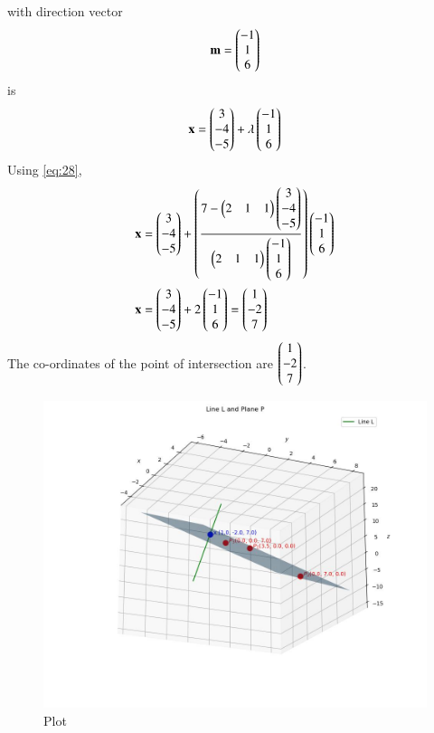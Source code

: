 \documentclass[journal]{IEEEtran}
\begin{document}
with direction vector 
\begin{align*}
    \mathbf{m} = \begin{pmatrix}-1 \\ 1 \\ 6\end{pmatrix}
\end{align*}
is
\begin{align}
    \mathbf{x} = \begin{pmatrix}3 \\ -4 \\ -5\end{pmatrix} + \lambda \begin{pmatrix}-1 \\ 1 \\ 6\end{pmatrix} \label{eq:line_eqn}
\end{align}
Using \eqref{eq:28},
\begin{align}
    \mathbf{x} &= \begin{pmatrix}3 \\ -4 \\ -5\end{pmatrix} + \left(\frac{7 - \begin{pmatrix}2 & 1 & 1\end{pmatrix}\begin{pmatrix}3 \\ -4 \\ -5\end{pmatrix}}{\begin{pmatrix}2 & 1 & 1\end{pmatrix}\begin{pmatrix}-1 \\ 1 \\ 6\end{pmatrix}}\right)\begin{pmatrix}-1 \\ 1 \\ 6\end{pmatrix} \\
    \mathbf{x} &= \begin{pmatrix}3 \\ -4 \\ -5\end{pmatrix} + 2\begin{pmatrix}-1 \\ 1 \\ 6\end{pmatrix} = \begin{pmatrix}1 \\ -2 \\ 7\end{pmatrix}
\end{align}
The co-ordinates of the point of intersection are $\begin{pmatrix}1 \\ -2 \\ 7\end{pmatrix}$.

\begin{figure}[h!]
	\centering
	\includegraphics[width=\columnwidth]{figs/plot_c.jpg}
	\caption*{Plot}
	\label{fig:fig}
\end{figure}
\end{document}

